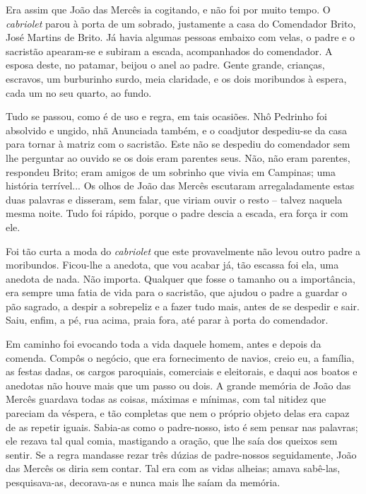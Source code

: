 Era assim que João das Mercês ia cogitando, e não foi por muito tempo. O
\emph{cabriolet} parou à porta de um sobrado, justamente a casa do
Comendador Brito, José Martins de Brito. Já havia algumas pessoas
embaixo com velas, o padre e o sacristão apearam-se e subiram a escada,
acompanhados do comendador. A esposa deste, no patamar, beijou o anel ao
padre. Gente grande, crianças, escravos, um burburinho surdo, meia
claridade, e os dois moribundos à espera, cada um no seu quarto, ao
fundo.

Tudo se passou, como é de uso e regra, em tais ocasiões. Nhô Pedrinho
foi absolvido e ungido, nhã Anunciada também, e o coadjutor despediu-se
da casa para tornar à matriz com o sacristão. Este não se despediu do
comendador sem lhe perguntar ao ouvido se os dois eram parentes seus.
Não, não eram parentes, respondeu Brito; eram amigos de um sobrinho que
vivia em Campinas; uma história terrível... Os olhos de João das Mercês
escutaram arregaladamente estas duas palavras e disseram, sem falar, que
viriam ouvir o resto -- talvez naquela mesma noite. Tudo foi rápido,
porque o padre descia a escada, era força ir com ele.

Foi tão curta a moda do \emph{cabriolet} que este provavelmente não
levou outro padre a moribundos. Ficou-lhe a anedota, que vou acabar já,
tão escassa foi ela, uma anedota de nada. Não importa. Qualquer que
fosse o tamanho ou a importância, era sempre uma fatia de vida para o
sacristão, que ajudou o padre a guardar o pão sagrado, a despir a
sobrepeliz e a fazer tudo mais, antes de se despedir e sair. Saiu,
enfim, a pé, rua acima, praia fora, até parar à porta do comendador.

Em caminho foi evocando toda a vida daquele homem, antes e depois da
comenda. Compôs o negócio, que era fornecimento de navios, creio eu, a
família, as festas dadas, os cargos paroquiais, comerciais e eleitorais,
e daqui aos boatos e anedotas não houve mais que um passo ou dois. A
grande memória de João das Mercês guardava todas as coisas, máximas e
mínimas, com tal nitidez que pareciam da véspera, e tão completas que
nem o próprio objeto delas era capaz de as repetir iguais. Sabia-as como
o padre-nosso, isto é sem pensar nas palavras; ele rezava tal qual
comia, mastigando a oração, que lhe saía dos queixos sem sentir. Se a
regra mandasse rezar três dúzias de padre-nossos seguidamente, João das
Mercês os diria sem contar. Tal era com as vidas alheias; amava
sabê-las, pesquisava-as, decorava-as e nunca mais lhe saíam da memória.

